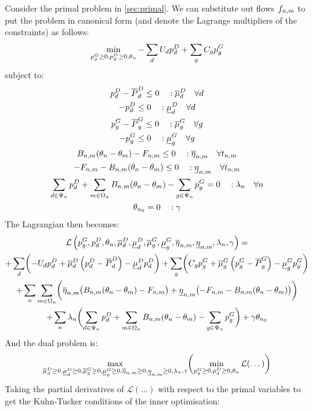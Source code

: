 \documentclass[11pt,a4paper]{article}
\numberwithin{equation}{section}
\begin{document}
Consider the primal problem in \cref{sec:primal}. We can substitute out flows $f_{n,m}$ to put the problem in canonical form (and denote the Lagrange multipliers of the constraints) as follows:
\begin{equation}
\min_{p^G_g \geq 0 ,p^D_d \geq 0,\theta_n} - \sum_d U_d p^D_d + \sum_g C_g p^G_g 
\end{equation}
subject to:
\begin{gather}
p^D_d - \overline{P}^D_d \leq 0 \quad : \overline{\mu}_d^D \quad \forall d  \\
- p^D_d \leq 0 \quad : \underline{\mu}_d^D \quad \forall d  \\
p^G_g - \overline{P}^G_g \leq 0 \quad : \overline{\mu}_g^G \quad \forall g  \\
- p^G_g \leq 0 \quad : \underline{\mu}_g^G \quad \forall g  \\
B_{n,m}(\theta_n - \theta_m) - F_{n,m} \leq 0 \quad : \overline{\eta}_{n,m} \quad \forall t_{n,m} \\
-F_{n,m} - B_{n,m}(\theta_n - \theta_m) \leq 0 \quad : \underline{\eta}_{n,m} \quad \forall t_{n,m} \\
\sum_{d \in \Psi_n} p^D_d + \sum_{m \in \Omega_n} B_{n,m}(\theta_n - \theta_m) - \sum_{g \in \Psi_n} p^G_g = 0 \quad : \lambda_n \quad \forall n  \\
\theta_{n_0} = 0 \quad : \gamma
\end{gather}
The Lagrangian then becomes:
\begin{multline}
\mathcal{L} \left( p^G_g, p^D_d, \theta_n, \overline{\mu}_d^D, \underline{\mu}_d^D, \overline{\mu}_g^G, \underline{\mu}_g^G, \overline{\eta}_{n,m}, \underline{\eta}_{n,m}, \lambda_n, \gamma  \right) = \\
+ \sum_d \biggl( - U_d p^D_d + \overline{\mu}_d^D \left( p^D_d - \overline{P}^D_d \right) - \underline{\mu}_d^D p^D_d \biggr)
+ \sum_g \biggl( C_g p^G_g + \overline{\mu}_g^G \left( p^G_g - \overline{P}^G_g \right) - \underline{\mu}_g^G p^G_g \biggr) \\
+ \sum_n \sum_{m \in \Omega_n} \biggl( \overline{\eta}_{n,m} \bigl(B_{n,m}(\theta_n - \theta_m) - F_{n,m} \bigr) 
+ \underline{\eta}_{n,m} \bigl(-F_{n,m} - B_{n,m}(\theta_n - \theta_m) \bigr) \biggr) \\
+ \sum_n \lambda_n \biggl( \sum_{d \in \Psi_n} p^D_d + \sum_{m \in \Omega_n} B_{n,m}(\theta_n - \theta_m) - \sum_{g \in \Psi_n} p^G_g \biggr) 
+ \gamma \theta_{n_0}
\end{multline}
And the dual problem is:
\begin{equation}
\max_{\overline{\mu}_d^D \geq 0, \underline{\mu}_d^D \geq 0, \overline{\mu}_g^G \geq 0, \underline{\mu}_g^G \geq 0, \overline{\eta}_{n,m} \geq 0, \underline{\eta}_{n,m} \geq 0, \lambda_n, \gamma} \biggl( \min_{p^G_g \geq 0 ,p^D_d \geq 0,\theta_n} \mathcal{L} (\dots) \biggr)
\end{equation}
Taking the partial derivatives of $\mathcal{L}(\dots)$ with respect to the primal variables to get the Kuhn-Tucker conditions of the inner optimisation:
\end{document}
